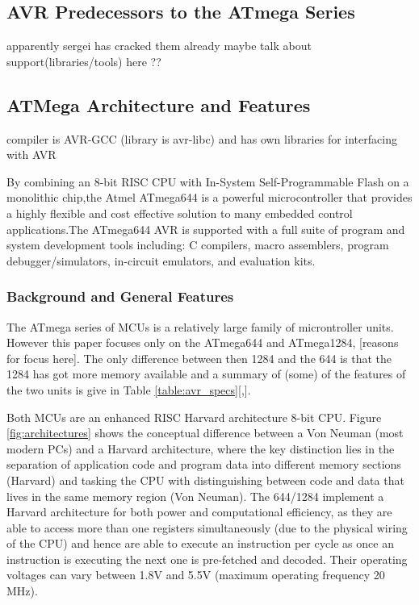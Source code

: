 \documentclass[12pt,a4paper,twocolumn]{article}
\begin{document}
	\subsection{AVR Predecessors to the ATmega Series}
	apparently sergei has cracked them already
	maybe talk about support(libraries/tools) here ?? \cite{website:scorobogatov_breaking_copy_protection}
	\subsection{ATMega Architecture and Features}
		compiler is AVR-GCC (library is avr-libc) and has own libraries for interfacing with AVR
		
		
By combining an 8-bit RISC CPU with In-System Self-Programmable Flash on a monolithic chip,the Atmel ATmega644 is a powerful microcontroller that provides a highly flexible and cost effective solution to many embedded control applications.The ATmega644 AVR is supported with a full suite of program and system development tools including: C compilers, macro assemblers, program debugger/simulators, in-circuit emulators, and evaluation kits.	

	\subsubsection{Background and General Features}
	The ATmega series of MCUs is a relatively large family of microntroller units. However this paper focuses only on the ATmega644 and ATmega1284, [reasons for focus here]. The only difference between then 1284 and the 644 is that the 1284 has got more memory available and a summary of (some) of the features of the two units is give in Table \ref{table:avr_specs}[\citep{atmega644_manual},\citep{atmega1284_manual}]. 
	
	Both MCUs are an enhanced RISC Harvard architecture 8-bit CPU. Figure \ref{fig:architectures} shows the conceptual difference between a Von Neuman (most modern PCs) and a Harvard architecture, where the key distinction lies in the separation of application code and program data into different memory sections (Harvard) and tasking the CPU with distinguishing between code and data that lives in the same memory region (Von Neuman). The 644/1284 implement a Harvard architecture for both power and computational efficiency, as they are able to access more than one registers simultaneously (due to the physical wiring of the CPU) and hence are able to execute an instruction per cycle as once an instruction is executing the next one is pre-fetched and decoded. Their operating voltages can vary between 1.8V and 5.5V (maximum operating frequency 20 MHz).
	
\end{document}
